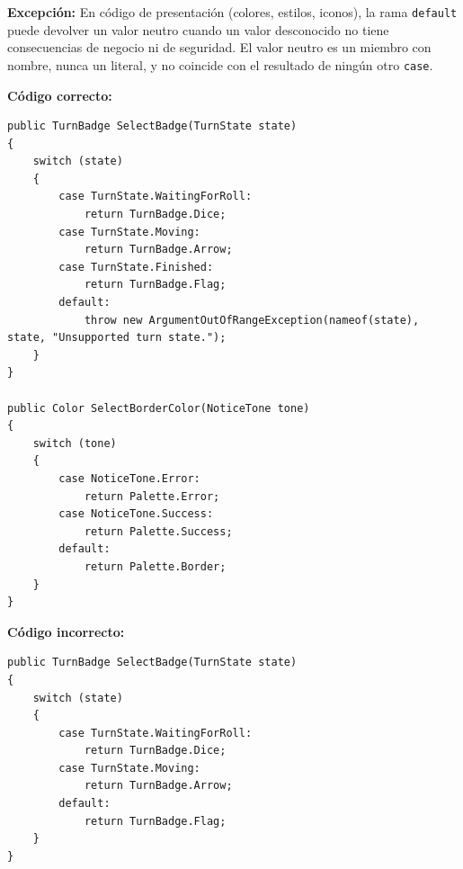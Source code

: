 \textbf{Excepción:} En código de presentación (colores, estilos, iconos), la rama \texttt{default} puede devolver un valor neutro cuando un valor desconocido no tiene consecuencias de negocio ni de seguridad. El valor neutro es un miembro con nombre, nunca un literal, y no coincide con el resultado de ningún otro \texttt{case}.

\textbf{Código correcto:}
\begin{lstlisting}[style=csharpstyle]
public TurnBadge SelectBadge(TurnState state)
{
    switch (state)
    {
        case TurnState.WaitingForRoll:
            return TurnBadge.Dice;
        case TurnState.Moving:
            return TurnBadge.Arrow;
        case TurnState.Finished:
            return TurnBadge.Flag;
        default:
            throw new ArgumentOutOfRangeException(nameof(state), state, "Unsupported turn state.");
    }
}

public Color SelectBorderColor(NoticeTone tone)
{
    switch (tone)
    {
        case NoticeTone.Error:
            return Palette.Error;
        case NoticeTone.Success:
            return Palette.Success;
        default:
            return Palette.Border;
    }
}
\end{lstlisting}

\textbf{Código incorrecto:}
\begin{lstlisting}[style=csharpstyle]
public TurnBadge SelectBadge(TurnState state)
{
    switch (state)
    {
        case TurnState.WaitingForRoll:
            return TurnBadge.Dice;
        case TurnState.Moving:
            return TurnBadge.Arrow;
        default:
            return TurnBadge.Flag;
    }
}
\end{lstlisting}
